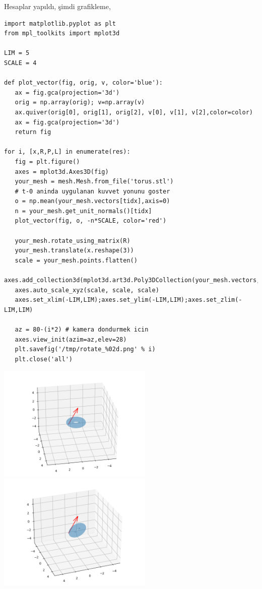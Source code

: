 \documentclass[12pt,fleqn]{article}\usepackage{../../common}
\begin{document}
Hesaplar yapıldı, şimdi grafikleme,

\begin{verbatim}
import matplotlib.pyplot as plt
from mpl_toolkits import mplot3d

LIM = 5
SCALE = 4

def plot_vector(fig, orig, v, color='blue'):
   ax = fig.gca(projection='3d')
   orig = np.array(orig); v=np.array(v)
   ax.quiver(orig[0], orig[1], orig[2], v[0], v[1], v[2],color=color)
   ax = fig.gca(projection='3d')  
   return fig

for i, [x,R,P,L] in enumerate(res):
   fig = plt.figure()
   axes = mplot3d.Axes3D(fig)
   your_mesh = mesh.Mesh.from_file('torus.stl')
   # t-0 aninda uygulanan kuvvet yonunu goster
   o = np.mean(your_mesh.vectors[tidx],axis=0)
   n = your_mesh.get_unit_normals()[tidx]
   plot_vector(fig, o, -n*SCALE, color='red')
   
   your_mesh.rotate_using_matrix(R)
   your_mesh.translate(x.reshape(3))
   scale = your_mesh.points.flatten()
   axes.add_collection3d(mplot3d.art3d.Poly3DCollection(your_mesh.vectors,alpha=0.3))
   axes.auto_scale_xyz(scale, scale, scale)
   axes.set_xlim(-LIM,LIM);axes.set_ylim(-LIM,LIM);axes.set_zlim(-LIM,LIM)

   az = 80-(i*2) # kamera dondurmek icin
   axes.view_init(azim=az,elev=28)
   plt.savefig('/tmp/rotate_%02d.png' % i)
   plt.close('all')    
\end{verbatim}

\includegraphics[width=20em]{sim2/rotate_00.png}
\includegraphics[width=20em]{sim2/rotate_05.png}
\end{document}
